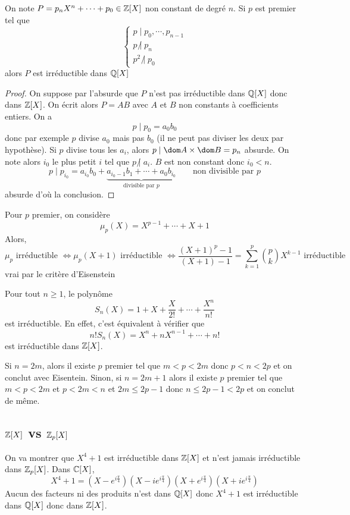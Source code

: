 \begin{res}
On note $P=p_nX^n+\cdots + p_0\in\mathbb Z[X]$ non constant de degré $n$. Si $p$ est premier tel que \[
    \begin{cases}
    p\;|\;p_0,\cdots, p_{n-1}\\ p\;\not|\;p_n\\p^2\;\not|\;p_0
    \end{cases}
\]
alors $P$ est irréductible dans $\mathbb Q[X]$
\end{res}
\begin{proof}
On suppose par l'absurde que $P$ n'est pas irréductible dans $\mathbb Q[X]$ donc dans $\mathbb Z[X]$. On écrit alors $P=AB$ avec $A$ et $B$ non constants à coefficients entiers. On a \[
    p\;|\;p_0=a_0b_0
\]
donc par exemple $p$ divise $a_0$ mais pas $b_0$ (il ne peut pas diviser les deux par hypothèse). Si $p$ divise tous les $a_i$, alors $p\;|\;\dom A\times \dom B=p_n$ absurde. On note alors $i_0$ le plus petit $i$ tel que $p\;\not |\;a_i$. $B$ est non constant donc $i_0<n$. \[
    p\;|\; p_{i_0}=a_{i_0}b_0+\underbrace{a_{i_0-1}b_1+\cdots +a_0b_{i_0}}_{\text{divisible par }p} \qquad \text{non divisible par }p
\]
absurde d'où la conclusion.
\end{proof}

\begin{csq}
Pour $p$ premier, on considère \[
    \mu_p(X)=X^{p-1}+\cdots+X+1
\]
Alors, \[
    \mu_p\text{ irréductible }\iff \mu_p(X+1)\text{ irréductible } \iff \frac{(X+1)^p-1}{(X+1)-1}=\sum_{k=1}^p\binom pk X^{k-1}\text{ irréductible}
\]
vrai par le critère d'Eisenstein
\end{csq}

\begin{csq}
Pour tout $n\geq 1$, le polynôme \[
    S_n(X)=1+X+\frac{X}{2!}+\cdots +\frac{X^n}{n!}
\]
est irréductible. En effet, c'est équivalent à vérifier que \[
    n!S_n(X)=X^n+nX^{n-1}+\cdots+n!
\]
est irréductible dans $\mathbb Z[X]$.

Si $n=2m$, alors il existe $p$ premier tel que $m<p<2m$ donc $p<n<2p$ et on conclut avec Eisentein. Sinon, si $n=2m+1$ alors il existe $p$ premier tel que $m<p<2m$ et $p<2m<n$ et $2m\leq 2p-1$ donc $n\leq 2p-1<2p$ et on conclut de même.
\end{csq}

\subsection{{$\mathbb Z[X]$} vs {$\mathbb Z_p[X]$}}

On va montrer que $X^4+1$ est irréductible dans $\mathbb Z[X]$ et n'est jamais irréductible dans $\mathbb Z_p[X]$. Dans $\mathbb C[X]$, \[
    X^4+1=\left(X-e^{i\frac\pi4}\right)\left(X-ie^{i\frac\pi4}\right)\left(X+e^{i\frac\pi4}\right)\left(X+ie^{i\frac\pi4}\right)
\]
Aucun des facteurs ni des produits n'est dans $\mathbb Q[X]$ donc $X^4+1$ est irréductible dans $\mathbb Q[X]$ donc dans $\mathbb Z[X]$.

